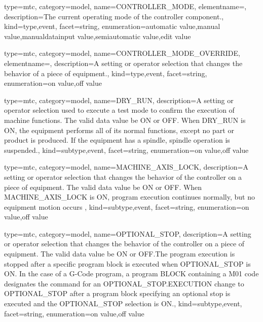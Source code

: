 {
  type=mtc,
  category=model,
  name={CONTROLLER\_MODE},
  elementname=,
  description={The current operating mode of the \gls{controller} component.},
  kind={type,event},
  facet={\gls{string}},
  enumeration={\gls{automatic value},\gls{manual value},\gls{manualdatainput value},\gls{semiautomatic value},\gls{edit value}}
}


{
  type=mtc,
  category=model,
  name={CONTROLLER\_MODE\_OVERRIDE},
  elementname=,
  description={A setting or operator selection that changes the behavior of a piece of equipment.},
  kind={type,event},
  facet={\gls{string}},
  enumeration={\gls{on value},\gls{off value}}
}


{
  type=mtc,
  category=model,
  name={DRY\_RUN},
  description={A setting or operator selection used to execute a test mode to confirm the execution of machine functions.  The \gls{valid data value} \must be ON or OFF. \newline When DRY\_RUN is ON, the equipment performs all of its normal functions, except no part or product is produced.  If the equipment has a spindle, spindle operation is suspended.},
  kind={subtype,event},
  facet={\gls{string}},
  enumeration={\gls{on value},\gls{off value}}
}


{
  type=mtc,
  category=model,
  name={MACHINE\_AXIS\_LOCK},
  description={A setting or operator selection that changes the behavior of the controller on a piece of equipment.  The \gls{valid data value} \must be ON or OFF. \newline When MACHINE\_AXIS\_LOCK is ON, program execution continues normally, but no equipment motion occurs },
  kind={subtype,event},
  facet={\gls{string}},
  enumeration={\gls{on value},\gls{off value}}
}


{
  type=mtc,
  category=model,
  name={OPTIONAL\_STOP},
  description={A setting or operator selection that changes the behavior of the controller on a piece of equipment.  The \gls{valid data value} \must be ON or OFF.The program execution is stopped after a specific program block is executed when OPTIONAL\_STOP is ON.    \newline In the case of a G-Code program, a program BLOCK containing a M01 code designates the command for an OPTIONAL\_STOP.EXECUTION \must change to OPTIONAL\_STOP after a program block specifying an optional stop is executed and the OPTIONAL\_STOP selection is ON.},
  kind={subtype,event},
  facet={\gls{string}},
  enumeration={\gls{on value},\gls{off value}}
}


